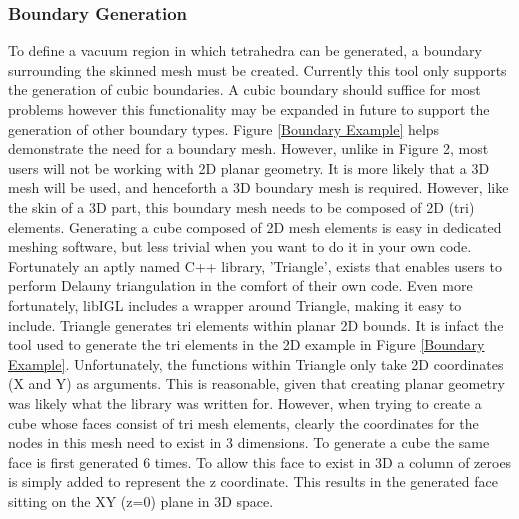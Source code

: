 \documentclass[12pt, letterpaper]{article}
\begin{document}
\subsubsection{Boundary Generation} \label{BoundaryGeneration}
To define a vacuum region in which tetrahedra can be generated, a boundary surrounding the skinned mesh must be created. Currently this tool only supports the generation of cubic boundaries. A cubic boundary should suffice for most problems however this functionality may be expanded in future to support the generation of other boundary types. Figure \ref{Boundary Example} helps demonstrate the need for a boundary mesh. However, unlike in Figure 2, most users will not be working with 2D planar geometry. It is more likely that a 3D mesh will be used, and henceforth a 3D boundary mesh is required. However, like the skin of a 3D part, this boundary mesh needs to be composed of 2D (tri) elements. Generating a cube composed of 2D mesh elements is easy in dedicated meshing software, but less trivial when you want to do it in your own code. Fortunately an aptly named C++ library, 'Triangle', exists that enables users to perform Delauny triangulation in the comfort of their own code. Even more fortunately, libIGL includes a wrapper around Triangle, making it easy to include. Triangle generates tri elements within planar 2D bounds. It is infact the tool used to generate the tri elements in the 2D example in Figure \ref{Boundary Example}.  Unfortunately, the functions within Triangle only take 2D coordinates (X and Y) as arguments. This is reasonable, given that creating planar geometry was likely what the library was written for. However, when trying to create a cube whose faces consist of tri mesh elements, clearly the coordinates for the nodes in this mesh need to exist in 3 dimensions. To generate a cube the same face is first generated 6 times. To allow this face to exist in 3D a column of zeroes is simply added to represent the z coordinate. This results in the generated face sitting on the XY (z=0) plane in 3D space.
\end{document}

